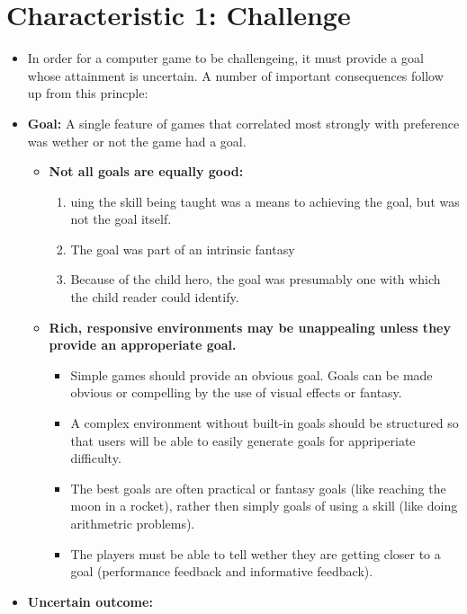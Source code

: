   \section*{Characteristic 1: Challenge}
    \begin{itemize}
      \item In order for a computer game to be challengeing, it must provide a goal whose attainment is uncertain. A number of important consequences follow up from this princple:
      \item {\bf Goal:} A single feature of games that correlated most strongly with preference was wether or not the game had a goal.
        \begin{itemize}
          \item {\bf Not all goals are equally good:}
            \begin{enumerate}
              \item uing the skill being taught was a means to achieving the goal, but was not the goal itself.
              \item The goal was part of an intrinsic fantasy
              \item Because of the child hero, the goal was presumably one with which the child reader could identify.
            \end{enumerate}
          \item {\bf Rich, responsive environments may be unappealing unless they provide an approperiate goal.}
            \begin{itemize}
              \item Simple games should provide an obvious goal. Goals can be made obvious or compelling by the use of visual effects or fantasy.
              \item A complex environment without built-in goals should be structured so that users will be able to easily generate goals for appriperiate difficulty. 
              \item The best goals are often practical or fantasy goals (like reaching the moon in a rocket), rather then simply goals of using a skill (like doing arithmetric problems).
              \item The players must be able to tell wether they are getting closer to a goal (performance feedback and informative feedback).
            \end{itemize}
        \end{itemize}
        \item {\bf Uncertain outcome:}
          \begin{itemize}

\end{itemize}
\end{itemize}

